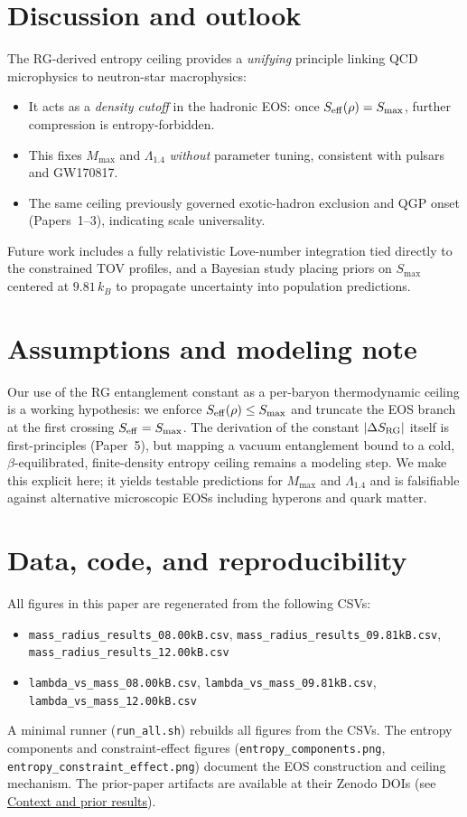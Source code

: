 \documentclass[11pt]{article}
\begin{document}
\section{Discussion and outlook}
\label{sec:discussion}
The RG-derived entropy ceiling provides a \emph{unifying} principle linking QCD microphysics to neutron-star macrophysics:
\begin{itemize}[leftmargin=1.2em]
\item It acts as a \emph{density cutoff} in the hadronic EOS: once $S_{\rm eff}(\rho)=S_{\max}$, further compression is entropy-forbidden. 
\item This fixes $M_{\max}$ and $\Lambda_{1.4}$ \emph{without} parameter tuning, consistent with pulsars and GW170817.
\item The same ceiling previously governed exotic-hadron exclusion and QGP onset (Papers~1--3), indicating scale universality.
\end{itemize}
Future work includes a fully relativistic Love-number integration tied directly to the constrained TOV profiles, and a Bayesian study placing priors on $S_{\max}$ centered at $9.81\,k_B$ to propagate uncertainty into population predictions.

\section*{Assumptions and modeling note}
\noindent
Our use of the RG entanglement constant as a per-baryon thermodynamic ceiling is a working hypothesis: we enforce $S_{\rm eff}(\rho) \le S_{\max}$ and truncate the EOS branch at the first crossing $S_{\rm eff}=S_{\max}$. The derivation of the constant $|\Delta S_{\rm RG}|$ itself is first-principles (Paper~5), but mapping a vacuum entanglement bound to a cold, $\beta$-equilibrated, finite-density entropy ceiling remains a modeling step. We make this explicit here; it yields testable predictions for $M_{\max}$ and $\Lambda_{1.4}$ and is falsifiable against alternative microscopic EOSs including hyperons and quark matter.

\section*{Data, code, and reproducibility}
\noindent
All figures in this paper are regenerated from the following CSVs:
\begin{itemize}[leftmargin=1.2em]
\item \texttt{mass\_radius\_results\_08.00kB.csv}, 
\texttt{mass\_radius\_results\_09.81kB.csv}, 
\texttt{mass\_radius\_results\_12.00kB.csv}
\item \texttt{lambda\_vs\_mass\_08.00kB.csv}, 
\texttt{lambda\_vs\_mass\_09.81kB.csv}, 
\texttt{lambda\_vs\_mass\_12.00kB.csv}
\end{itemize}
A minimal runner (\texttt{run\_all.sh}) rebuilds all figures from the CSVs. The entropy components and constraint-effect figures (\texttt{entropy\_components.png}, \texttt{entropy\_constraint\_effect.png}) document the EOS construction and ceiling mechanism. The prior-paper artifacts are available at their Zenodo DOIs (see \hyperref[sec:context]{Context and prior results}).
\end{document}
